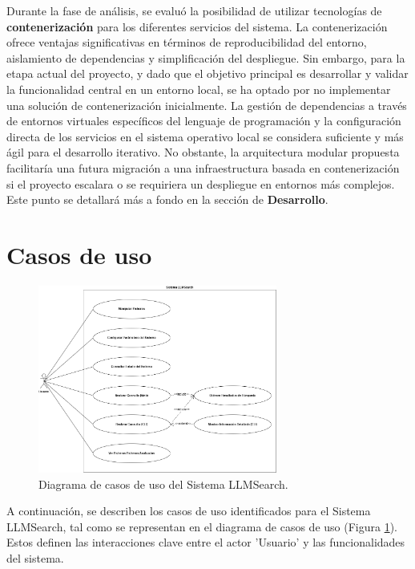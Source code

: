 Durante la fase de análisis, se evaluó la posibilidad de utilizar tecnologías de \textbf{contenerización} para los diferentes servicios del sistema. La contenerización ofrece ventajas significativas en términos de reproducibilidad del entorno, aislamiento de dependencias y simplificación del despliegue. Sin embargo, para la etapa actual del proyecto, y dado que el objetivo principal es desarrollar y validar la funcionalidad central en un entorno local, se ha optado por no implementar una solución de contenerización inicialmente. La gestión de dependencias a través de entornos virtuales específicos del lenguaje de programación y la configuración directa de los servicios en el sistema operativo local se considera suficiente y más ágil para el desarrollo iterativo. No obstante, la arquitectura modular propuesta facilitaría una futura migración a una infraestructura basada en contenerización si el proyecto escalara o se requiriera un despliegue en entornos más complejos. Este punto se detallará más a fondo en la sección de \textbf{Desarrollo}.
\section{Casos de uso}
\label{sec:casos_de_uso}

\begin{figure}[H]
\centering
\includegraphics[width=0.7\textwidth]{archivos/casos_de_uso.png}
\caption[Diagrama de Casos de Uso de LLMSearch]{Diagrama de casos de uso del Sistema LLMSearch.}
\label{fig:casos_de_uso}
\end{figure}

A continuación, se describen los casos de uso identificados para el Sistema LLMSearch, tal como se representan en el diagrama de casos de uso (Figura \ref{fig:casos_de_uso}). Estos definen las interacciones clave entre el actor 'Usuario' y las funcionalidades del sistema.

